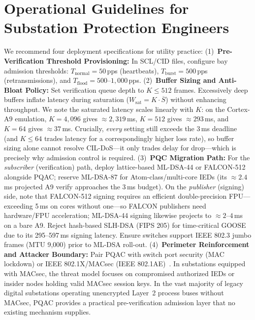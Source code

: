 \documentclass[journal]{IEEEtran}
\begin{document}
\section{Operational Guidelines for Substation Protection Engineers}
\label{sec:guidelines}
We recommend four deployment specifications for utility practice:
(1)~\textbf{Pre-Verification Threshold Provisioning:} In SCL/CID files, configure bay admission thresholds: $T_{\text{normal}} = 50$\,pps (heartbeats), $T_{\text{burst}} = 500$\,pps (retransmissions), and $T_{\text{flood}} = 500\text{--}1{,}000$\,pps.
(2)~\textbf{Buffer Sizing and Anti-Bloat Policy:} Set verification queue depth to $K \le 512$ frames. Excessively deep buffers inflate latency during saturation ($W_{\text{sat}} = K \cdot \overline{S}$) without enhancing throughput. We note the saturated latency scales linearly with $K$: on the Cortex-A9 emulation, $K=4{,}096$ gives $\approx 2{,}319$\,ms, $K=512$ gives $\approx 293$\,ms, and $K=64$ gives $\approx 37$\,ms. Crucially, \emph{every} setting still exceeds the 3\,ms deadline (and $K\le 64$ trades latency for a correspondingly higher loss rate), so buffer sizing alone cannot resolve CIL-DoS---it only trades delay for drop---which is precisely why admission control is required.
(3)~\textbf{PQC Migration Path:} For the \emph{subscriber} (verification) path, deploy lattice-based ML-DSA-44 or FALCON-512 alongside PQAC; reserve ML-DSA-87 for Atom-class/multi-core IEDs (its $\approx 2.4$\,ms projected A9 verify approaches the 3\,ms budget). On the \emph{publisher} (signing) side, note that FALCON-512 signing requires an efficient double-precision FPU---exceeding 5\,ms on cores without one---so FALCON publishers need hardware/FPU acceleration; ML-DSA-44 signing likewise projects to $\approx 2\text{--}4$\,ms on a bare A9. Reject hash-based SLH-DSA (FIPS 205) for time-critical GOOSE due to its 295--597\,ms signing latency. Ensure switches support IEEE 802.3 jumbo frames (MTU 9,000) prior to ML-DSA roll-out.
(4)~\textbf{Perimeter Reinforcement and Attacker Boundary:} Pair PQAC with switch port security (MAC lockdown) or IEEE 802.1X/MACsec (IEEE 802.1AE)~\cite{ieee8021x}. In substations equipped with MACsec, the threat model focuses on compromised authorized IEDs or insider nodes holding valid MACsec session keys. In the vast majority of legacy digital substations operating unencrypted Layer~2 process buses without MACsec, PQAC provides a practical pre-verification admission layer that no existing mechanism supplies.

\end{document}
